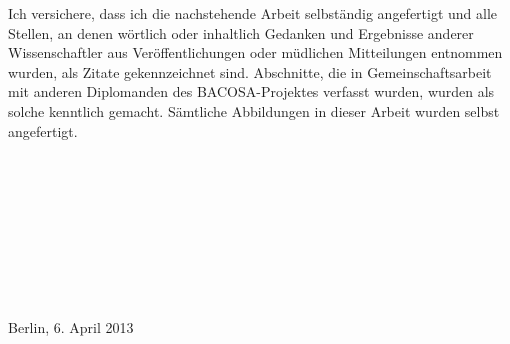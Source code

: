 Ich versichere, dass ich die nachstehende Arbeit selbständig angefertigt und alle Stellen, an denen wörtlich oder inhaltlich Gedanken und Ergebnisse anderer Wissenschaftler aus Veröffentlichungen oder müdlichen Mitteilungen entnommen wurden, als Zitate gekennzeichnet sind. 
Abschnitte, die in Gemeinschaftsarbeit mit anderen Diplomanden des BACOSA-Projektes verfasst wurden, wurden als solche kenntlich gemacht. 
Sämtliche Abbildungen in dieser Arbeit wurden selbst angefertigt. 
\\
\\
\\
\\
\\
\\
\\
\\
\\
\\
Berlin, 6. April 2013





